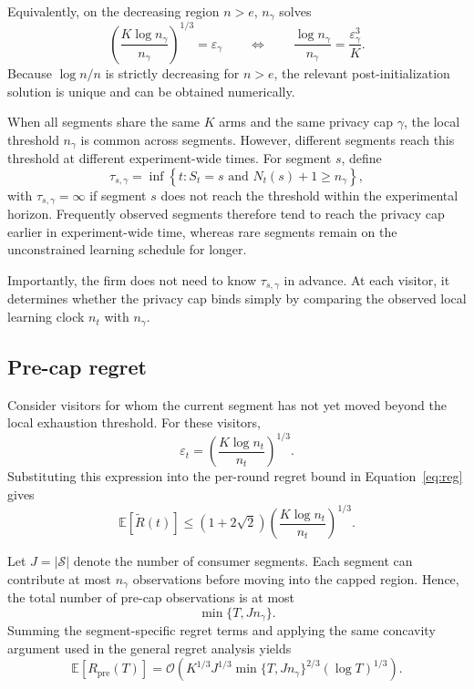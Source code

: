 \documentclass[mksc,nonblindrev]{informs3}
\begin{document}
\begin{APPENDICES}
Equivalently, on the decreasing region \(n>e\), \(n_\gamma\) solves
\begin{equation}
\label{eq:n-gamma-equation}
\left(
\frac{K\log n_\gamma}{n_\gamma}
\right)^{1/3}
=
\varepsilon_\gamma
\qquad\Longleftrightarrow\qquad
\frac{\log n_\gamma}{n_\gamma}
=
\frac{\varepsilon_\gamma^3}{K}.
\end{equation}
Because \(\log n/n\) is strictly decreasing for \(n>e\), the relevant post-initialization solution is unique and can be obtained numerically.

When all segments share the same \(K\) arms and the same privacy cap \(\gamma\), the local threshold \(n_\gamma\) is common across segments. However, different segments reach this threshold at different experiment-wide times. For segment \(s\), define
\begin{equation}
\label{eq:segment-global-exhaustion}
\tau_{s,\gamma}
=
\inf\left\{
t:
S_t=s
\text{ and }
N_t(s)+1\geq n_\gamma
\right\},
\end{equation}
with \(\tau_{s,\gamma}=\infty\) if segment \(s\) does not reach the threshold within the experimental horizon. Frequently observed segments therefore tend to reach the privacy cap earlier in experiment-wide time, whereas rare segments remain on the unconstrained learning schedule for longer.

Importantly, the firm does not need to know \(\tau_{s,\gamma}\) in advance. At each visitor, it determines whether the privacy cap binds simply by comparing the observed local learning clock
\(n_t\) with \(n_\gamma\).

\subsection{Pre-cap regret}

Consider visitors for whom the current segment has not yet moved beyond the local exhaustion threshold. For these visitors,
\[
\varepsilon_t
=
\left(
\frac{K\log n_t}{n_t}
\right)^{1/3}.
\]
Substituting this expression into the per-round regret bound in Equation~\eqref{eq:reg} gives
\begin{equation}
\label{eq:precap-perround}
\mathbb E[\widetilde R(t)]
\leq
(1+2\sqrt{2})
\left(
\frac{K\log n_t}{n_t}
\right)^{1/3}.
\end{equation}

Let \(J=|\mathcal S|\) denote the number of consumer segments. Each segment can contribute at most \(n_\gamma\) observations before moving into the capped region. Hence, the total number of pre-cap observations is at most
\[
\min\{T,Jn_\gamma\}.
\]
Summing the segment-specific regret terms and applying the same concavity argument used in the general regret analysis yields
\begin{equation}
\label{eq:precap-regret}
\mathbb E[R_{\mathrm{pre}}(T)]
=
\mathcal O\left(
K^{1/3}
J^{1/3}
\min\{T,Jn_\gamma\}^{2/3}
(\log T)^{1/3}
\right).
\end{equation}


\end{APPENDICES}
\end{document}
